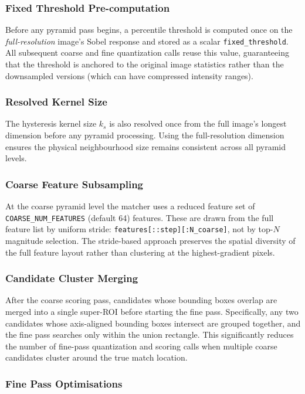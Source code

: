 \documentclass[12pt,a4paper]{article}
\begin{document}
\subsubsection{Fixed Threshold Pre-computation}
Before any pyramid pass begins, a percentile threshold is computed once on the
\emph{full-resolution} image's Sobel response and stored as a scalar
\texttt{fixed\_threshold}.  All subsequent coarse and fine quantization calls
reuse this value, guaranteeing that the threshold is anchored to the original
image statistics rather than the downsampled versions (which can have compressed
intensity ranges).

\subsubsection{Resolved Kernel Size}
The hysteresis kernel size $k_s$ is also resolved once from the full image's
longest dimension before any pyramid processing.  Using the full-resolution
dimension ensures the physical neighbourhood size remains consistent across all
pyramid levels.

\subsubsection{Coarse Feature Subsampling}
At the coarse pyramid level the matcher uses a reduced feature set of
\texttt{COARSE\_NUM\_FEATURES} (default 64) features.  These are drawn from the
full feature list by uniform stride: \texttt{features[::step][:N\_coarse]}, not by
top-$N$ magnitude selection.  The stride-based approach preserves the spatial
diversity of the full feature layout rather than clustering at the highest-gradient
pixels.

\subsubsection{Candidate Cluster Merging}
After the coarse scoring pass, candidates whose bounding boxes overlap are merged
into a single super-ROI before starting the fine pass.  Specifically, any two
candidates whose axis-aligned bounding boxes intersect are grouped together, and the
fine pass searches only within the union rectangle.  This significantly reduces the
number of fine-pass quantization and scoring calls when multiple coarse candidates
cluster around the true match location.

\subsubsection{Fine Pass Optimisations}
\end{document}
